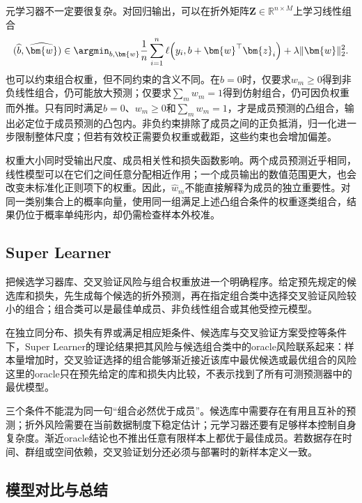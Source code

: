 元学习器不一定要很复杂。对回归输出，可以在折外矩阵$\bm{Z}\in\mathbb{R}^{n\times M}$上学习线性组合
\begin{equation}
  (\widehat{b},\widehat{\bm{w}})
  \in
  \argmin_{b,\bm{w}}
  \frac{1}{n}
  \sum_{i=1}^{n}
  \ell\!\left(
    y_i,
    b+\bm{w}^{\top}\bm{z}_i
  \right)
  +\lambda\lVert\bm{w}\rVert_2^2.
  \label{eq:ensemble-linear-stacking}
\end{equation}
也可以约束组合权重，但不同约束的含义不同。在$b=0$时，仅要求$w_m\geq0$得到非负线性组合，仍可能放大预测；仅要求$\sum_mw_m=1$得到仿射组合，仍可因负权重而外推。只有同时满足$b=0$、$w_m\geq0$和$\sum_mw_m=1$，才是成员预测的凸组合，输出必定位于成员预测的凸包内。非负约束排除了成员之间的正负抵消，归一化进一步限制整体尺度；但若有效校正需要负权重或截距，这些约束也会增加偏差。

权重大小同时受输出尺度、成员相关性和损失函数影响。两个成员预测近乎相同，线性模型可以在它们之间任意分配相近作用；一个成员输出的数值范围更大，也会改变未标准化正则项下的权重。因此，$\widehat{w}_m$不能直接解释为成员的独立重要性。对同一类别集合上的概率向量，使用同一组满足上述凸组合条件的权重逐类组合，结果仍位于概率单纯形内，却仍需检查样本外校准。

\subsection{Super Learner}
\label{sec:ensemble-super-learner}

把候选学习器库、交叉验证风险与组合权重放进一个明确程序。给定预先规定的候选库和损失，先生成每个候选的折外预测，再在指定组合类中选择交叉验证风险较小的组合；组合类可以是最佳单成员、非负线性组合或其他受控元模型。

在独立同分布、损失有界或满足相应矩条件、候选库与交叉验证方案受控等条件下，Super Learner的理论结果把其风险与候选组合类中的oracle风险联系起来：样本量增加时，交叉验证选择的组合能够渐近接近该库中最优候选或最优组合的风险这里的oracle只在预先给定的库和损失内比较，不表示找到了所有可测预测器中的最优模型。

三个条件不能混为同一句“组合必然优于成员”。候选库中需要存在有用且互补的预测；折外风险需要在当前数据制度下稳定估计；元学习器还要有足够样本控制自身复杂度。渐近oracle结论也不推出任意有限样本上都优于最佳成员。若数据存在时间、群组或空间依赖，交叉验证划分还必须与部署时的新样本定义一致。

\subsection{模型对比与总结}
\label{sec:ensemble-stacking-comparison}


